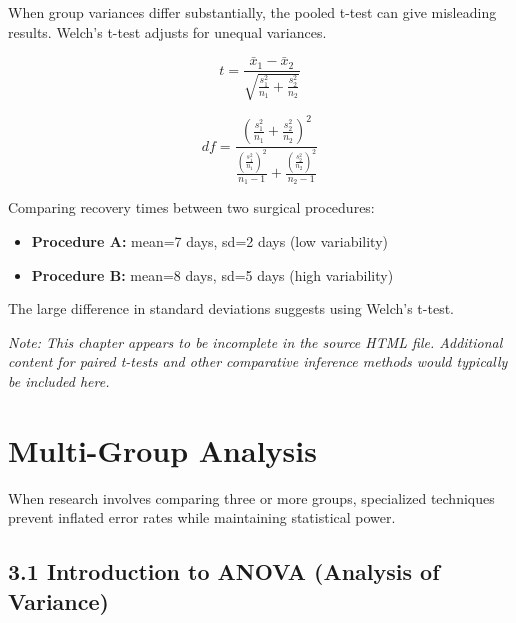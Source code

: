 \documentclass[
  11pt,
  letterpaper,
  oneside]{book}
\providecommand{\tightlist}{%
  \setlength{\itemsep}{0pt}\setlength{\parskip}{0pt}}\usepackage{longtable,booktabs,array}
\begin{document}
When group variances differ substantially, the pooled t-test can give
misleading results. Welch's t-test adjusts for unequal variances.

\[t = \frac{\bar{x}_1 - \bar{x}_2}{\sqrt{\frac{s_1^2}{n_1} + \frac{s_2^2}{n_2}}}\]

\[df = \frac{\left(\frac{s_1^2}{n_1} + \frac{s_2^2}{n_2}\right)^2}{\frac{\left(\frac{s_1^2}{n_1}\right)^2}{n_1-1} + \frac{\left(\frac{s_2^2}{n_2}\right)^2}{n_2-1}}\]

\begin{tcolorbox}[enhanced jigsaw, left=2mm, title=\textcolor{quarto-callout-tip-color}{\faLightbulb}\hspace{0.5em}{When Variances Differ}, toprule=.15mm, toptitle=1mm, arc=.35mm, colframe=quarto-callout-tip-color-frame, breakable, coltitle=black, bottomtitle=1mm, bottomrule=.15mm, titlerule=0mm, opacitybacktitle=0.6, colback=white, leftrule=.75mm, rightrule=.15mm, opacityback=0, colbacktitle=quarto-callout-tip-color!10!white]

Comparing recovery times between two surgical procedures:

\begin{itemize}
\tightlist
\item
  \textbf{Procedure A:} mean=7 days, sd=2 days (low variability)
\item
  \textbf{Procedure B:} mean=8 days, sd=5 days (high variability)
\end{itemize}

The large difference in standard deviations suggests using Welch's
t-test.

\end{tcolorbox}

\emph{Note: This chapter appears to be incomplete in the source HTML
file. Additional content for paired t-tests and other comparative
inference methods would typically be included here.}


\chapter{Multi-Group Analysis}\label{multi-group-analysis}

When research involves comparing three or more groups, specialized
techniques prevent inflated error rates while maintaining statistical
power.

\section{3.1 Introduction to ANOVA (Analysis of
Variance)}\label{introduction-to-anova-analysis-of-variance}
\end{document}
